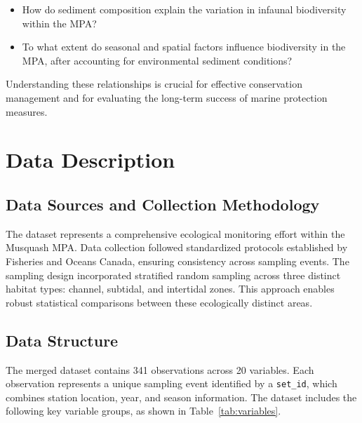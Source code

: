 \documentclass[12pt]{article}
\begin{document}
\begin{itemize}
    \item How do sediment composition explain the variation in infaunal biodiversity within the MPA?
    \item To what extent do seasonal and spatial factors influence biodiversity in the MPA, after accounting for environmental sediment conditions?
\end{itemize}

\qquad Understanding these relationships is crucial for effective conservation management and for evaluating the long-term success of marine protection measures.

\newpage

\section{Data Description}

\subsection{Data Sources and Collection Methodology}

\qquad The dataset represents a comprehensive ecological monitoring effort within the Musquash MPA. Data collection followed standardized protocols established by Fisheries and Oceans Canada, ensuring consistency across sampling events. The sampling design incorporated stratified random sampling across three distinct habitat types: channel, subtidal, and intertidal zones. This approach enables robust statistical comparisons between these ecologically distinct areas.

\subsection{Data Structure}

\qquad The merged dataset contains 341 observations across 20 variables. Each observation represents a unique sampling event identified by a \texttt{set\_id}, which combines station location, year, and season information. The dataset includes the following key variable groups, as shown in Table~\ref{tab:variables}. 
\end{document}
